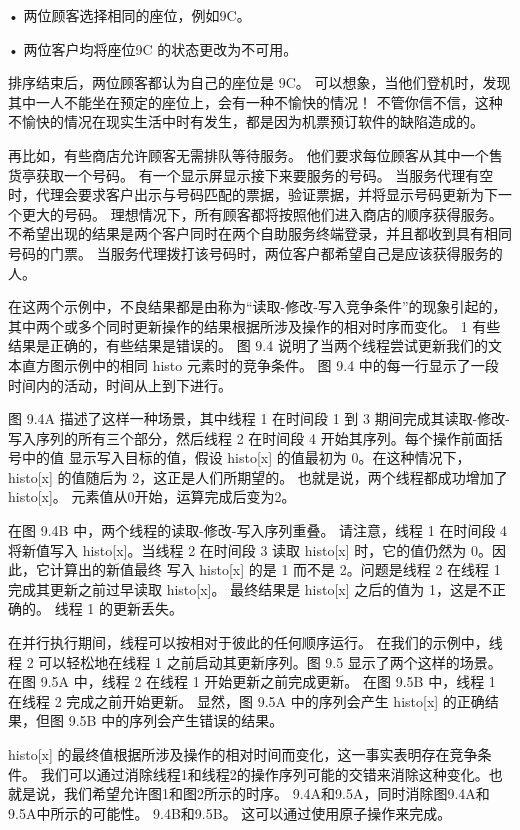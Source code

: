• 两位顾客选择相同的座位，例如9C。

• 两位客户均将座位9C 的状态更改为不可用。

排序结束后，两位顾客都认为自己的座位是 9C。 可以想象，当他们登机时，发现其中一人不能坐在预定的座位上，会有一种不愉快的情况！ 不管你信不信，这种不愉快的情况在现实生活中时有发生，都是因为机票预订软件的缺陷造成的。

再比如，有些商店允许顾客无需排队等待服务。 他们要求每位顾客从其中一个售货亭获取一个号码。 有一个显示屏显示接下来要服务的号码。 当服务代理有空时，代理会要求客户出示与号码匹配的票据，验证票据，并将显示号码更新为下一个更大的号码。 理想情况下，所有顾客都将按照他们进入商店的顺序获得服务。 不希望出现的结果是两个客户同时在两个自助服务终端登录，并且都收到具有相同号码的门票。 当服务代理拨打该号码时，两位客户都希望自己是应该获得服务的人。

在这两个示例中，不良结果都是由称为“读取-修改-写入竞争条件”的现象引起的，其中两个或多个同时更新操作的结果根据所涉及操作的相对时序而变化。 1 有些结果是正确的，有些结果是错误的。 图 9.4 说明了当两个线程尝试更新我们的文本直方图示例中的相同 histo 元素时的竞争条件。 图 9.4 中的每一行显示了一段时间内的活动，时间从上到下进行。

图 9.4A 描述了这样一种场景，其中线程 1 在时间段 1 到 3 期间完成其读取-修改-写入序列的所有三个部分，然后线程 2 在时间段 4 开始其序列。每个操作前面括号中的值 显示写入目标的值，假设 histo[x] 的值最初为 0。在这种情况下，histo[x] 的值随后为 2，这正是人们所期望的。 也就是说，两个线程都成功增加了 histo[x]。 元素值从0开始，运算完成后变为2。

在图 9.4B 中，两个线程的读取-修改-写入序列重叠。 请注意，线程 1 在时间段 4 将新值写入 histo[x]。当线程 2 在时间段 3 读取 histo[x] 时，它的值仍然为 0。因此，它计算出的新值最终 写入 histo[x] 的是 1 而不是 2。问题是线程 2 在线程 1 完成其更新之前过早读取 histo[x]。 最终结果是 histo[x] 之后的值为 1，这是不正确的。 线程 1 的更新丢失。

在并行执行期间，线程可以按相对于彼此的任何顺序运行。 在我们的示例中，线程 2 可以轻松地在线程 1 之前启动其更新序列。图 9.5 显示了两个这样的场景。 在图 9.5A 中，线程 2 在线程 1 开始更新之前完成更新。 在图 9.5B 中，线程 1 在线程 2 完成之前开始更新。 显然，图 9.5A 中的序列会产生 histo[x] 的正确结果，但图 9.5B 中的序列会产生错误的结果。

histo[x] 的最终值根据所涉及操作的相对时间而变化，这一事实表明存在竞争条件。 我们可以通过消除线程1和线程2的操作序列可能的交错来消除这种变化。也就是说，我们希望允许图1和图2所示的时序。 9.4A和9.5A，同时消除图9.4A和9.5A中所示的可能性。 9.4B和9.5B。 这可以通过使用原子操作来完成。


